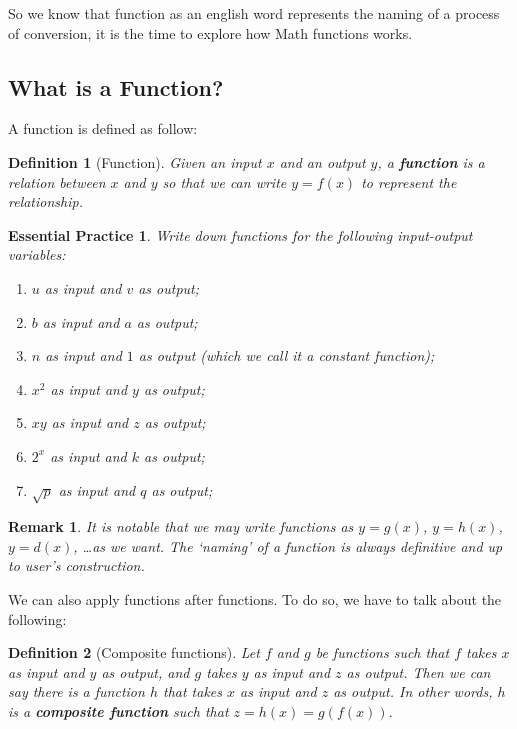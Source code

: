 \documentclass[12pt]{article}
\newtheorem{definition}{Definition}[section]
\newtheorem*{remark}{Remark}
\newtheorem{exercise}{Essential Practice}[subsubsection]
\begin{document}
    So we know that function as an english word represents the naming of a process of conversion, it is the time to explore how Math functions works.

    \subsection{What is a Function?}

    A function is defined as follow:

    \begin{definition}[Function]
        Given an input $x$ and an output $y$, a \textbf{function} is a relation between $x$ and $y$ so that we can write $y=f(x)$ to represent the relationship. 
    \end{definition}

    \begin{exercise}
        Write down functions for the following input-output variables:\begin{enumerate}
            \item $u$ as input and $v$ as output;
            \item $b$ as input and $a$ as output;
            \item $n$ as input and $1$ as output (which we call it a constant function);
            \item $x^2$ as input and $y$ as output;
            \item $xy$ as input and $z$ as output;
            \item $2^x$ as input and $k$ as output;
            \item $\sqrt{p}$ as input and $q$ as output;
        \end{enumerate}
    \end{exercise}

    \begin{remark}
        It is notable that we may write functions as $y=g(x)$, $y=h(x)$, $y=d(x)$, \dots as we want. The `naming' of a function is always definitive and up to user's construction.
    \end{remark}

    We can also apply functions after functions. To do so, we have to talk about the following:

    \begin{definition}[Composite functions]
        Let $f$ and $g$ be functions such that $f$ takes $x$ as input and $y$ as output, and $g$ takes $y$ as input and $z$ as output. Then we can say there is a function $h$ that takes $x$ as input and $z$ as output. In other words, $h$ is a \textbf{composite function} such that $z=h(x)=g(f(x))$.
    \end{definition}
\end{document}
